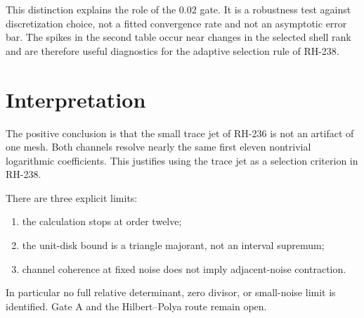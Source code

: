 \documentclass[11pt]{article}
\theoremstyle{remark}
\begin{document}
This distinction explains the role of the $0.02$ gate.  It is a robustness
test against discretization choice, not a fitted convergence rate and not an
asymptotic error bar.  The spikes in the second table occur near changes in
the selected shell rank and are therefore useful diagnostics for the
adaptive selection rule of RH-238.

\section{Interpretation}

The positive conclusion is that the small trace jet of RH-236 is not an
artifact of one mesh.  Both channels resolve nearly the same first eleven
nontrivial logarithmic coefficients.  This justifies using the trace jet as a
selection criterion in RH-238.

There are three explicit limits:
\begin{enumerate}[leftmargin=2em]
\item the calculation stops at order twelve;
\item the unit-disk bound is a triangle majorant, not an interval supremum;
\item channel coherence at fixed noise does not imply adjacent-noise
contraction.
\end{enumerate}

In particular no full relative determinant, zero divisor, or small-noise
limit is identified.  Gate A and the Hilbert--Polya route remain open.



\end{document}
